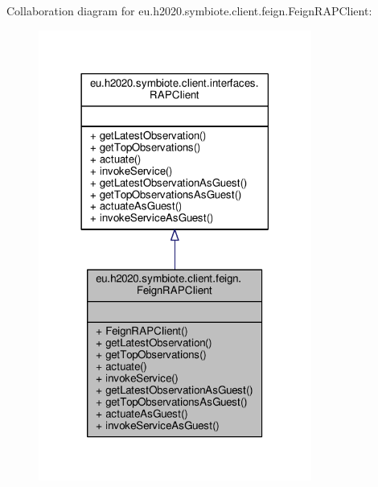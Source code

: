 Collaboration diagram for eu.\+h2020.\+symbiote.\+client.\+feign.\+Feign\+R\+A\+P\+Client\+:
\nopagebreak
\begin{figure}[H]
\begin{center}
\leavevmode
\includegraphics[width=254pt]{classeu_1_1h2020_1_1symbiote_1_1client_1_1feign_1_1FeignRAPClient__coll__graph}
\end{center}
\end{figure}
